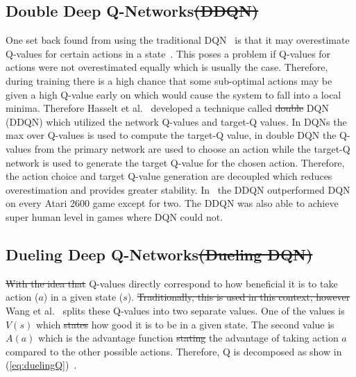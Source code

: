 \documentclass[12pt,american]{report}
\providecommand{\DIFaddtex}[1]{{\protect\color{blue}\uwave{#1}}} %
\providecommand{\DIFdeltex}[1]{{\protect\color{red}\sout{#1}}}                      %
\providecommand{\DIFaddbegin}{} %
\providecommand{\DIFaddend}{} %
\providecommand{\DIFdelbegin}{} %
\providecommand{\DIFdelend}{} %
\providecommand{\DIFadd}[1]{\texorpdfstring{\DIFaddtex{#1}}{#1}} %
\providecommand{\DIFdel}[1]{\texorpdfstring{\DIFdeltex{#1}}{}} %
\newcommand{\DIFscaledelfig}{0.5}
\newlength{\DIFdelgraphicswidth} %
\newlength{\DIFdelgraphicsheight} %
\newcommand{\DIFaddincludegraphics}[2][]{{\color{blue}\fbox{\DIFOincludegraphics[#1]{#2}}}} %
\newcommand{\DIFdelincludegraphics}[2][]{%
\sbox{\DIFdelgraphicsbox}{\DIFOincludegraphics[#1]{#2}}%
\settoboxwidth{\DIFdelgraphicswidth}{\DIFdelgraphicsbox} %
\settoboxtotalheight{\DIFdelgraphicsheight}{\DIFdelgraphicsbox} %
\scalebox{\DIFscaledelfig}{%
\parbox[b]{\DIFdelgraphicswidth}{\usebox{\DIFdelgraphicsbox}\\[-\baselineskip] \rule{\DIFdelgraphicswidth}{0em}}\llap{\resizebox{\DIFdelgraphicswidth}{\DIFdelgraphicsheight}{%
\setlength{\unitlength}{\DIFdelgraphicswidth}%
\begin{picture}(1,1)%
\thicklines\linethickness{2pt} %
{\color[rgb]{1,0,0}\put(0,0){\framebox(1,1){}}}%
{\color[rgb]{1,0,0}\put(0,0){\line( 1,1){1}}}%
{\color[rgb]{1,0,0}\put(0,1){\line(1,-1){1}}}%
\end{picture}%
}\hspace*{3pt}}} %
} %
\DeclareRobustCommand{\DIFaddbegin}{\DIFOaddbegin \let\includegraphics\DIFaddincludegraphics} %
\DeclareRobustCommand{\DIFaddend}{\DIFOaddend \let\includegraphics\DIFOincludegraphics} %
\DeclareRobustCommand{\DIFdelbegin}{\DIFOdelbegin \let\includegraphics\DIFdelincludegraphics} %
\DeclareRobustCommand{\DIFdelend}{\DIFOaddend \let\includegraphics\DIFOincludegraphics} %
\begin{document}
\subsection{Double Deep Q-Networks\DIFdelbegin \DIFdel{(DDQN)}\DIFdelend }

One set back found from using the traditional DQN~\cite{atari} is that it may overestimate Q-values for certain actions in a state~\cite{van2016deep}. This poses a problem if Q-values for actions were not overestimated equally which is usually the case.  Therefore, during training there is a high chance that some sub-optimal actions may be given a high Q-value early on which would cause the system to fall into a local minima.  Therefore Hasselt et al.~\cite{van2016deep} developed a technique called \DIFdelbegin \DIFdel{double }\DIFdelend \DIFaddbegin \DIFadd{Double }\DIFaddend DQN (DDQN) which utilized the network Q-values and target-Q values.  In DQNs the max over Q-values is used to compute the target-Q value, in double DQN the Q-values from the primary network are used to choose an action while the target-Q network is used to generate the target Q-value for the chosen action. Therefore, the action choice and target Q-value generation are decoupled which reduces overestimation and provides greater stability.  In~\cite{van2016deep} the DDQN outperformed DQN on every Atari 2600 game except for two. The DDQN was also able to achieve super human level in games where DQN could not. 

\subsection{Dueling Deep Q-Networks\DIFdelbegin \DIFdel{(Dueling DQN)}\DIFdelend }
\label{sec:DuelingDQN}
\DIFdelbegin \DIFdel{With the idea that }\DIFdelend Q-values directly correspond to how beneficial it is to take action ($a$) in a given state ($s$). \DIFdelbegin \DIFdel{Traditionally, this is used in this context, however }\DIFdelend Wang et al.~\cite{wang2015dueling} splits these Q-values into two separate values.  One of the values is $V(s)$ which \DIFdelbegin \DIFdel{states }\DIFdelend \DIFaddbegin \DIFadd{indicates }\DIFaddend how good it is to be in a given state. The second value is $A(a)$ which is the advantage function \DIFdelbegin \DIFdel{stating }\DIFdelend \DIFaddbegin \DIFadd{indicating }\DIFaddend the advantage of taking action $a$ compared to the other possible actions.  Therefore, Q is decomposed as show in (\ref{eq:duelingQ})~\cite{wang2015dueling}.
\end{document}
